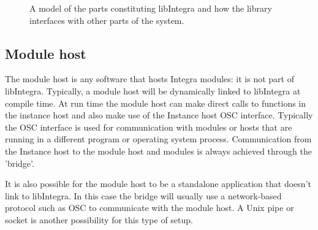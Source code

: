\begin{figure}
\centerline{}
\caption{A model of the parts constituting libIntegra and how the library interfaces with other parts of the system.}
\label{fig:model}
\end{figure}

\subsection{Module host}\label{subsec:module_host}

The module host is any software that hosts Integra modules: it is not part of libIntegra. Typically, a module host will be dynamically linked to libIntegra at compile time. At run time the module host can make direct calls to functions in the instance host and also make use of the Instance host OSC interface. Typically the OSC interface is used for communication with modules or hosts that are running in a different program or operating system process. Communication from the Instance host to the module host and modules is always achieved through the 'bridge'.

It is also possible for the module host to be a standalone application that doesn't link to libIntegra. In this case the bridge will usually use a network-based protocol such as OSC to communicate with the module host. A Unix pipe or socket is another possibility for this type of setup.

